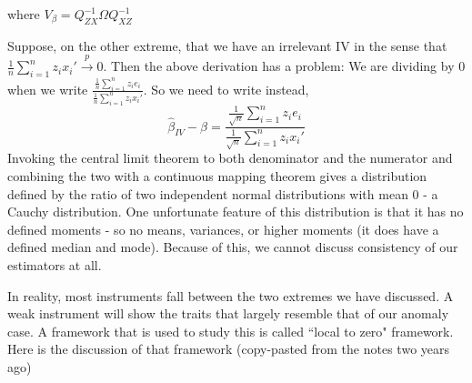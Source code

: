 \documentclass[12pt]{article}
\theoremstyle{definition}
\theoremstyle{property}
\theoremstyle{assumption}
\theoremstyle{example}
\theoremstyle{comment}
\begin{document}
where $V_\beta= Q_{ZX}^{-1}\Omega Q_{XZ}^{-1}$
\par
Suppose, on the other extreme, that we have an irrelevant IV in the sense that $\frac{1}{n}\sum_{i=1}^n z_ix_i'\xrightarrow{p}0$. Then the above derivation has a problem: We are dividing by 0 when we write $\frac{\frac{1}{n}\sum_{i=1}^n z_ie_i}{\frac{1}{n}\sum_{i=1}^nz_ix_i'}$. So we need to write instead, 
\[
\hat{\beta}_{IV}-\beta=\frac{\frac{1}{\sqrt{n}}\sum_{i=1}^n z_ie_i}{\frac{1}{\sqrt{n}}\sum_{i=1}^nz_ix_i'}
\]
Invoking the central limit theorem to both denominator and the numerator and combining the two with a continuous mapping theorem gives a distribution defined by the ratio of two independent normal distributions with mean 0 - a Cauchy distribution. One unfortunate feature of this distribution is that it has no defined moments - so no means, variances, or higher moments (it does have a defined median and mode). Because of this, we cannot discuss consistency of our estimators at all. 
\par
In reality, most instruments fall between the two extremes we have discussed. A weak instrument will show the traits that largely resemble that of our anomaly case. A framework that is used to study this is called ``local to zero" framework. Here is the discussion of that framework (copy-pasted from the notes two years ago)
\end{document}
